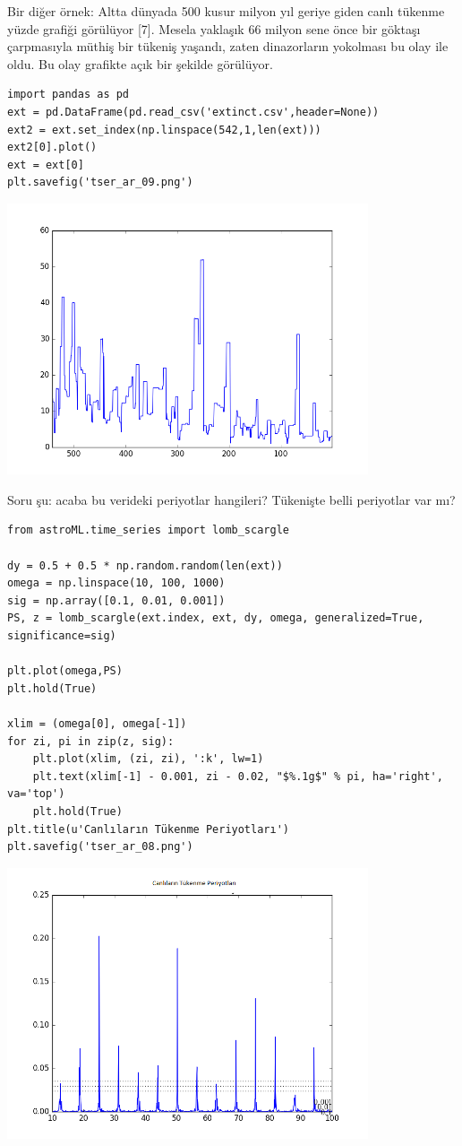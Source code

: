 \documentclass[12pt,fleqn]{article}\usepackage{../../common}
\begin{document}
Bir diğer örnek: Altta dünyada 500 kusur milyon yıl geriye giden canlı tükenme
yüzde grafiği görülüyor [7]. Mesela yaklaşık 66 milyon sene önce bir göktaşı
çarpmasıyla müthiş bir tükeniş yaşandı, zaten dinazorların yokolması bu olay ile
oldu. Bu olay grafikte açık bir şekilde görülüyor.

\begin{verbatim}
import pandas as pd
ext = pd.DataFrame(pd.read_csv('extinct.csv',header=None))
ext2 = ext.set_index(np.linspace(542,1,len(ext)))
ext2[0].plot()
ext = ext[0]
plt.savefig('tser_ar_09.png')
\end{verbatim}

\includegraphics[height=8cm]{tser_ar_09.png}

Soru şu: acaba bu verideki periyotlar hangileri? Tükenişte belli periyotlar var mı?

\begin{verbatim}
from astroML.time_series import lomb_scargle

dy = 0.5 + 0.5 * np.random.random(len(ext))
omega = np.linspace(10, 100, 1000)
sig = np.array([0.1, 0.01, 0.001])
PS, z = lomb_scargle(ext.index, ext, dy, omega, generalized=True, significance=sig)

plt.plot(omega,PS)
plt.hold(True)

xlim = (omega[0], omega[-1])
for zi, pi in zip(z, sig):
    plt.plot(xlim, (zi, zi), ':k', lw=1)
    plt.text(xlim[-1] - 0.001, zi - 0.02, "$%.1g$" % pi, ha='right', va='top')
    plt.hold(True)
plt.title(u'Canlıların Tükenme Periyotları')
plt.savefig('tser_ar_08.png')
\end{verbatim}

\includegraphics[height=8cm]{tser_ar_08.png}
\end{document}
